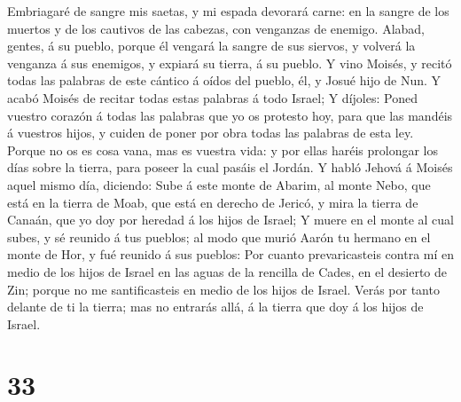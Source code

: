  Embriagaré de sangre mis saetas, y mi espada devorará
carne: en la sangre de los muertos y de los cautivos de las cabezas, con
venganzas de enemigo.  Alabad, gentes, á su pueblo,
porque él vengará la sangre de sus siervos, y volverá la venganza á sus
enemigos, y expiará su tierra, á su pueblo.  Y vino
Moisés, y recitó todas las palabras de este cántico á oídos del pueblo,
él, y Josué hijo de Nun.  Y acabó Moisés de recitar todas
estas palabras á todo Israel;  Y díjoles: Poned vuestro
corazón á todas las palabras que yo os protesto hoy, para que las
mandéis á vuestros hijos, y cuiden de poner por obra todas las palabras
de esta ley.  Porque no os es cosa vana, mas es vuestra
vida: y por ellas haréis prolongar los días sobre la tierra, para poseer
la cual pasáis el Jordán.  Y habló Jehová á Moisés aquel
mismo día, diciendo:  Sube á este monte de Abarim, al
monte Nebo, que está en la tierra de Moab, que está en derecho de
Jericó, y mira la tierra de Canaán, que yo doy por heredad á los hijos
de Israel;  Y muere en el monte al cual subes, y sé
reunido á tus pueblos; al modo que murió Aarón tu hermano en el monte de
Hor, y fué reunido á sus pueblos:  Por cuanto
prevaricasteis contra mí en medio de los hijos de Israel en las aguas de
la rencilla de Cades, en el desierto de Zin; porque no me santificasteis
en medio de los hijos de Israel.  Verás por tanto delante
de ti la tierra; mas no entrarás allá, á la tierra que doy á los hijos
de Israel.

\hypertarget{section-32}{%
\section{33}\label{section-32}}

